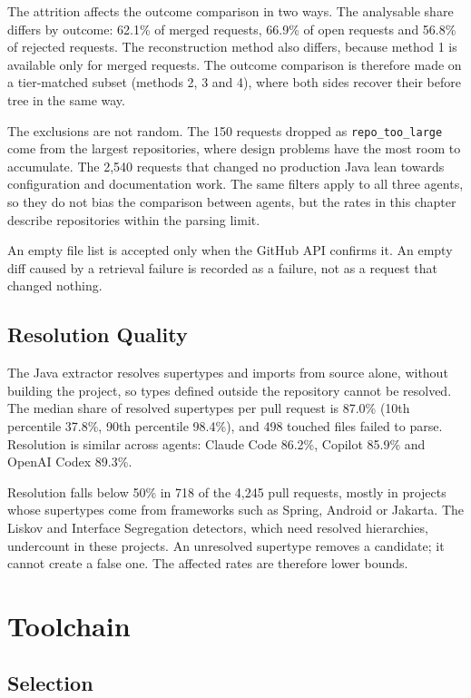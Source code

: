 The attrition affects the outcome comparison in two ways. The analysable share differs by outcome:
62.1\% of merged requests, 66.9\% of open requests and 56.8\% of rejected requests. The
reconstruction method also differs, because method 1 is available only for merged requests. The
outcome comparison is therefore made on a tier-matched subset (methods 2, 3 and 4), where both sides
recover their before tree in the same way.

The exclusions are not random. The 150 requests dropped as \texttt{repo\_too\_large} come from the
largest repositories, where design problems have the most room to accumulate. The 2{,}540 requests
that changed no production Java lean towards configuration and documentation work. The same filters
apply to all three agents, so they do not bias the comparison between agents, but the rates in this
chapter describe repositories within the parsing limit.

An empty file list is accepted only when the GitHub API confirms it. An empty diff caused by a
retrieval failure is recorded as a failure, not as a request that changed nothing.

\subsection{Resolution Quality}
\label{sec:resolution}

The Java extractor resolves supertypes and imports from source alone, without building the project,
so types defined outside the repository cannot be resolved. The median share of resolved supertypes
per pull request is 87.0\% (10th percentile 37.8\%, 90th percentile 98.4\%), and 498 touched files
failed to parse. Resolution is similar across agents: Claude Code 86.2\%, Copilot 85.9\% and OpenAI
Codex 89.3\%.

Resolution falls below 50\% in 718 of the 4{,}245 pull requests, mostly in projects whose supertypes
come from frameworks such as Spring, Android or Jakarta. The Liskov and Interface Segregation
detectors, which need resolved hierarchies, undercount in these projects. An unresolved supertype
removes a candidate; it cannot create a false one. The affected rates are therefore lower bounds.

\section{Toolchain}
\label{sec:toolchain}

\subsection{Selection}

